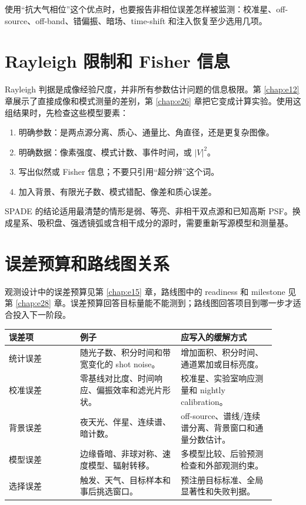 使用“抗大气相位”这个优点时，也要报告非相位误差怎样被监测：校准星、off-source、off-band、错偏振、暗场、time-shift 和注入恢复至少选用几项。

\section{Rayleigh 限制和 Fisher 信息}
\label{appsec:d-rayleigh}

Rayleigh 判据是成像经验尺度，并非所有参数估计问题的信息极限。第 \ref{chap:e12} 章展示了直接成像和模式测量的差别，第 \ref{chap:e26} 章把它变成计算实验。使用这组结果时，先检查这些模型要素：

\begin{enumerate}[leftmargin=*]
\item 明确参数：是两点源分离、质心、通量比、角直径，还是更复杂图像。
\item 明确数据：像素强度、模式计数、事件时间，或 \(|V|^2\)。
\item 写出似然或 Fisher 信息；不要只引用“超分辨”这个词。
\item 加入背景、有限光子数、模式错配、像差和质心误差。
\end{enumerate}

SPADE 的结论适用最清楚的情形是弱、等亮、非相干双点源和已知高斯 PSF。换成星系、吸积盘、强透镜弧或含相干成分的源时，需要重新写源模型和测量基。

\section{误差预算和路线图关系}
\label{appsec:d-error-budget}

观测设计中的误差预算见第 \ref{chap:e15} 章，路线图中的 readiness 和 milestone 见第 \ref{chap:e28} 章。误差预算回答目标量能不能测到；路线图回答项目到哪一步才适合投入下一阶段。

\begin{longtable}{p{0.24\linewidth}p{0.34\linewidth}p{0.32\linewidth}}
\toprule
误差项 & 例子 & 应写入的缓解方式 \\
\midrule
统计误差 & 随光子数、积分时间和带宽变化的 shot noise。 & 增加面积、积分时间、通道累加或目标亮度。 \\
校准误差 & 零基线对比度、时间响应、偏振效率和滤光片形状。 & 校准星、实验室响应测量和 nightly calibration。 \\
背景误差 & 夜天光、伴星、连续谱、暗计数。 & off-source、谱线/连续谱分离、背景窗口和通量分数估计。 \\
模型误差 & 边缘昏暗、非球对称、速度模型、辐射转移。 & 多模型比较、后验预测检查和外部观测约束。 \\
选择误差 & 触发、天气、目标样本和事后挑选窗口。 & 预注册目标标准、全局显著性和失败判据。 \\
\bottomrule
\end{longtable}
